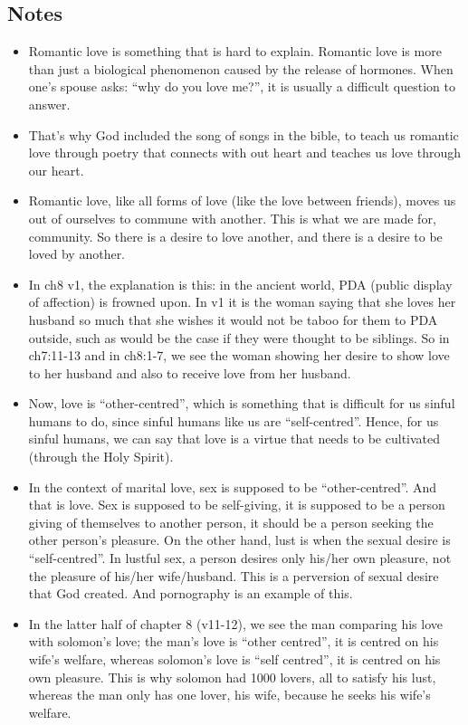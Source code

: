 \subsection*{Notes}
\begin{itemize}
  \item{Romantic love is something that is hard to explain. Romantic love is more than just a biological phenomenon caused by the release of hormones. When one’s spouse asks: “why do you love me?”, it is usually a difficult question to answer.}
  \item{That’s why God included the song of songs in the bible, to teach us romantic love through poetry that connects with out heart and teaches us love through our heart.}
  \item{Romantic love, like all forms of love (like the love between friends), moves us out of ourselves to commune with another. This is what we are made for, community. So there is a desire to love another, and there is a desire to be loved by another.}
  \item{In ch8 v1, the explanation is this: in the ancient world, PDA (public display of affection) is frowned upon. In v1 it is the woman saying that she loves her husband so much that she wishes it would not be taboo for them to PDA outside, such as would be the case if they were thought to be siblings. So in ch7:11-13 and in ch8:1-7, we see the woman showing her desire to show love to her husband and also to receive love from her husband.}
  \item{Now, love is “other-centred”, which is something that is difficult for us sinful humans to do, since sinful humans like us are “self-centred”. Hence, for us sinful humans, we can say that love is a virtue that needs to be cultivated (through the Holy Spirit).}
  \item{In the context of marital love, sex is supposed to be “other-centred”. And that is love. Sex is supposed to be self-giving, it is supposed to be a person giving of themselves to another person, it should be a person seeking the other person’s pleasure. On the other hand, lust is when the sexual desire is “self-centred”. In lustful sex, a person desires only his/her own pleasure, not the pleasure of his/her wife/husband. This is a perversion of sexual desire that God created. And pornography is an example of this.}
  \item{In the latter half of chapter 8 (v11-12), we see the man comparing his love with solomon’s love; the man’s love is “other centred”, it is centred on his wife’s welfare, whereas solomon’s love is “self centred”, it is centred on his own pleasure. This is why solomon had 1000 lovers, all to satisfy his lust, whereas the man only has one lover, his wife, because he seeks his wife’s welfare.}

\end{itemize}
